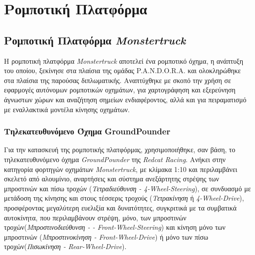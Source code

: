 
\chapter{Ρομποτική Πλατφόρμα} %


\label{Chapter2} %


\section{Ρομποτική Πλατφόρμα \textit{Monstertruck}} \label{sec:robotic_platform}
Η ρομποτική πλατφόρμα \textit{Monstertruck} αποτελεί ένα ρομποτικό όχημα, η ανάπτυξη του οποίου, ξεκίνησε στα πλαίσια της ομάδας P.A.N.D.O.R.A. και ολοκληρώθηκε στα πλαίσια της παρούσας διπλωματικής. Αναπτύχθηκε με σκοπό την χρήση σε εφαρμογές αυτόνομων ρομποτικών οχημάτων, για χαρτογράφηση και εξερεύνηση άγνωστων χώρων και αναζήτηση σημείων ενδιαφέροντος, αλλά και για πειραματισμό με εναλλακτικά μοντέλα κίνησης οχημάτων.

\subsection{Τηλεκατευθυνόμενο Όχημα GroundPounder} \label{ssec:groundpounder}
Για την κατασκευή της ρομποτικής πλατφόρμας, χρησιμοποιήθηκε, σαν βάση, το τηλεκατευθυνόμενο όχημα \textit{GroundPounder} της \textit{Redcat Racing}. Ανήκει στην κατηγορία φορτηγών οχημάτων \textit{Monstertruck}, με κλίμακα 1:10 και περιλαμβάνει σκελετό από αλουμίνιο, αναρτήσεις και σύστημα ανεξάρτητης στρέψης των μπροστινών και πίσω τροχών (\textit{Τετραδιεύθυνση - 4-Wheel-Steering}), σε συνδυασμό με μετάδοση της κίνησης και στους τέσσερις τροχούς (\textit{Τετρακίνηση} ή \textit{4-Wheel-Drive}), προσφέροντας μεγαλύτερη ευελιξία και δυνατότητες, συγκριτικά με τα συμβατικά αυτοκίνητα, που περιλαμβάνουν στρέψη, μόνο, των μπροστινών τροχών(\textit{Μπροστινοδιεύθυνση - - Front-Wheel-Steering}) και κίνηση μόνο των μπροστινών (\textit{Μπροστινοκίνηση - Front-Wheel-Drive}) ή μόνο των πίσω τροχών(\textit{Πισωκίνηση - Rear-Wheel-Drive}).

